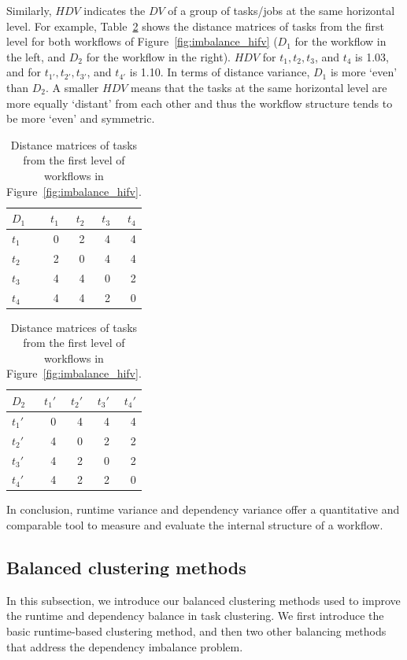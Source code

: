 Similarly, $HDV$ indicates the $DV$ of a group of tasks/jobs at the same horizontal level. For example, Table~\ref{tab:imblance_metric} shows the distance matrices of tasks from the first level for both workflows of Figure~\ref{fig:imbalance_hifv} ($D_1$ for the workflow in the left, and $D_2$ for the workflow in the right). $HDV$ for $t_1, t_2, t_3$, and $t_4$ is 1.03, and for $t_{1'}, t_{2'}, t_{3'}$, and $t_{4'}$ is 1.10. In terms of distance variance, $D_1$ is more `even' than $D_2$. A smaller $HDV$ means that the tasks at the same horizontal level are more equally `distant' from each other and thus the workflow structure tends to be more `even' and symmetric. 

\begin{table}[htb]
	\footnotesize
	\centering
	\begin{tabular}{l|rrrr}
		$D_1$ & $t_1$ & $t_2$ & $t_3$ &$t_4$\\
		\hline
		$t_1$ & 0 & 2 & 4 & 4 \\
		$t_2$ & 2 & 0 & 4 & 4 \\
		$t_3$ & 4 & 4 & 0 & 2\\
		$t_4$ & 4 & 4 & 2 & 0 \\
	\end{tabular}
	\quad
	\begin{tabular}{l|rrrr}
		$D_2$ & $t_1'$ & $t_2'$ & $t_3'$ &$t_4'$\\
		\hline
		$t_1'$ & 0 & 4 & 4 & 4 \\
		$t_2'$ & 4 & 0 & 2 & 2 \\
		$t_3'$ & 4 & 2 & 0 & 2\\
		$t_4'$ & 4 & 2 & 2 & 0 \\
	\end{tabular}
	\caption{Distance matrices of tasks from the first level of workflows in Figure~\ref{fig:imbalance_hifv}.}
	\label{tab:imblance_metric}
\end{table}

In conclusion, runtime variance and dependency variance offer a quantitative and comparable tool to measure and evaluate the internal structure of a workflow. 



\subsection{Balanced clustering methods}
\label{sec:balance:methods}
In this subsection, we introduce our balanced clustering methods used to improve the runtime and dependency balance in task clustering. We first introduce the basic runtime-based clustering method, and then two other balancing methods that address the dependency imbalance problem. 


